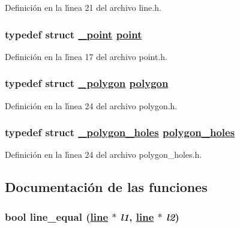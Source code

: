 Definici\'{o}n en la l\'{\i}nea 21 del archivo line.h.\hypertarget{group__geometry_g37e9de632d1eb76ff7dcd3d8172add7d_g37e9de632d1eb76ff7dcd3d8172add7d}{
\subsubsection[point]{\setlength{\rightskip}{0pt plus 5cm}typedef struct \hyperlink{struct__point}{\_\-point} \hyperlink{struct__point}{point}}}
\label{group__geometry_g37e9de632d1eb76ff7dcd3d8172add7d_g37e9de632d1eb76ff7dcd3d8172add7d}




Definici\'{o}n en la l\'{\i}nea 17 del archivo point.h.\hypertarget{group__geometry_g9169f21a34d344b356c44948943e99cc_g9169f21a34d344b356c44948943e99cc}{
\subsubsection[polygon]{\setlength{\rightskip}{0pt plus 5cm}typedef struct \hyperlink{struct__polygon}{\_\-polygon} \hyperlink{struct__polygon}{polygon}}}
\label{group__geometry_g9169f21a34d344b356c44948943e99cc_g9169f21a34d344b356c44948943e99cc}




Definici\'{o}n en la l\'{\i}nea 24 del archivo polygon.h.\hypertarget{group__geometry_g1137695e6ed0a9b25685f8bf3ccdb45f_g1137695e6ed0a9b25685f8bf3ccdb45f}{
\subsubsection[polygon\_\-holes]{\setlength{\rightskip}{0pt plus 5cm}typedef struct \hyperlink{struct__polygon__holes}{\_\-polygon\_\-holes} \hyperlink{struct__polygon__holes}{polygon\_\-holes}}}
\label{group__geometry_g1137695e6ed0a9b25685f8bf3ccdb45f_g1137695e6ed0a9b25685f8bf3ccdb45f}




Definici\'{o}n en la l\'{\i}nea 24 del archivo polygon\_\-holes.h.

\subsection{Documentaci\'{o}n de las funciones}
\hypertarget{group__geometry_ga27fbafb04a36a60af7bd5cafbdfd412_ga27fbafb04a36a60af7bd5cafbdfd412}{
\subsubsection[line\_\-equal]{\setlength{\rightskip}{0pt plus 5cm}bool line\_\-equal (\hyperlink{struct__line}{line} $\ast$ {\em l1}, \hyperlink{struct__line}{line} $\ast$ {\em l2})}}
\label{group__geometry_ga27fbafb04a36a60af7bd5cafbdfd412_ga27fbafb04a36a60af7bd5cafbdfd412}


